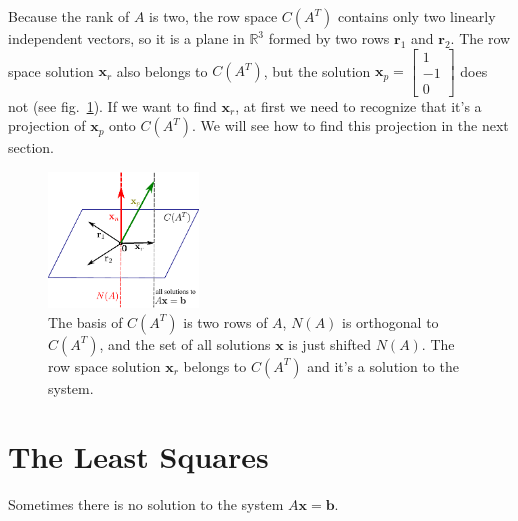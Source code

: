 \documentclass{acm_proc_article-sp}
\begin{document}
Because the rank of $A$ is two, the row space $C(A^T)$ contains only two linearly independent
vectors, so it is a plane in \(\mathbb R^3\) formed by two rows $\mathbf r_1$ and $\mathbf r_2$. The row space solution $\mathbf x_r$ also belongs to $C(A^T)$, but the solution $\mathbf x_p = \begin{bmatrix} 1 \\ -1 \\ 0 \end{bmatrix}$ does not (see fig.~\ref{fig:row-space-x-special}). If we want to find \(\mathbf x_r\), at first we need to recognize that it's a projection of \(\mathbf x_p\) onto \(C(A^T)\). We will see how to find
this projection in the next section.

\begin{figure}%
\centering
\includegraphics[width=4cm]{row-space-x-special3.pdf}
\caption{The basis of $C(A^T)$ is two rows of $A$, $N(A)$ is orthogonal to $C(A^T)$, and the set of all solutions $\mathbf x$ is just shifted $N(A)$. The row space solution $\mathbf x_r$ belongs to $C(A^T)$ and it's a solution to the system.}
\label{fig:row-space-x-special}
\end{figure}



\section{The Least Squares}

Sometimes there is no solution to the system $A \mathbf x = \mathbf b$.
\end{document}
